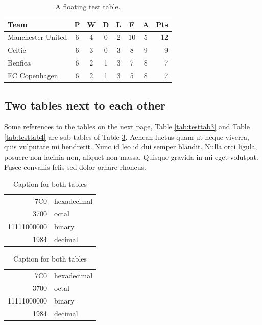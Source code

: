 \begin{table}[!ht]
  \centering
  \begin{tabular}{l*{6}{c}r}
      Team              & P & W & D & L & F  & A & Pts \\
      \hline
      Manchester United & 6 & 4 & 0 & 2 & 10 & 5 & 12  \\
      Celtic            & 6 & 3 & 0 & 3 &  8 & 9 &  9  \\
      Benfica           & 6 & 2 & 1 & 3 &  7 & 8 &  7  \\
      FC Copenhagen     & 6 & 2 & 1 & 3 &  5 & 8 &  7  \\
  \end{tabular}
  \caption{A floating test table.}
  \label{tab:testtab1}
\end{table}

\subsection{Two tables next to each other}
Some references to the tables on the next page, Table \ref{tab:testtab3} and
Table \ref{tab:testtab4} are sub-tables of Table \ref{tab:testtab2}. Aenean
luctus quam ut neque viverra, quis vulputate mi hendrerit. Nunc id leo id dui
semper blandit. Nulla orci ligula, posuere non lacinia non, aliquet non massa.
Quisque gravida in mi eget volutpat. Fusce convallis felis sed dolor ornare
rhoncus.

\begin{table}[!htb]
    \begin{subtable}{.5\linewidth}
      \centering
        \begin{tabular}{|r|l|}
            \hline
            7C0 & hexadecimal \\
            3700 & octal \\ \cline{2-2}
            11111000000 & binary \\
            \hline \hline
            1984 & decimal \\
            \hline
        \end{tabular}
        \caption{Caption for the first sub-table}
        \label{tab:testtab3}
    \end{subtable}%
    \begin{subtable}{.5\linewidth}
      \centering
        \begin{tabular}{|r|l|}
            \hline
            7C0 & hexadecimal \\
            3700 & octal \\ \cline{2-2}
            11111000000 & binary \\
            \hline \hline
            1984 & decimal \\
            \hline
        \end{tabular}
        \caption{Caption for the second sub-table}
        \label{tab:testtab4}
    \end{subtable}
    \caption{Caption for both tables}
    \label{tab:testtab2}
\end{table}


